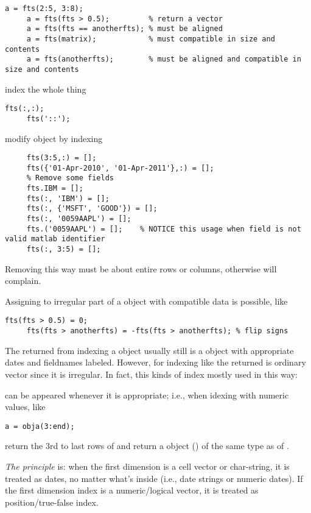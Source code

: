 \begin{itemize*}
\begin{lstlisting}[numbers=none]
     a = fts(2:5, 3:8);
     a = fts(fts > 0.5);         % return a vector
     a = fts(fts == anotherfts); % must be aligned 
     a = fts(matrix);            % must compatible in size and contents
     a = fts(anotherfts);        % must be aligned and compatible in size and contents
 \end{lstlisting}
\item index the whole thing
  \begin{lstlisting}[numbers=none]
     fts(:,:);
     fts('::');
  \end{lstlisting}
\item modify \myfints{} object by indexing
  \begin{lstlisting}[numbers=none]
     % Remove some dates
     fts(3:5,:) = [];            
     fts({'01-Apr-2010', '01-Apr-2011'},:) = []; 
     % Remove some fields
     fts.IBM = [];
     fts(:, 'IBM') = [];
     fts(:, {'MSFT', 'GOOD'}) = [];
	 fts(:, '0059AAPL') = [];
	 fts.('0059AAPL') = [];    % NOTICE this usage when field is not valid matlab identifier
     fts(:, 3:5) = [];
  \end{lstlisting} 
  Removing this way must be about entire rows or columns, otherwise \matlab{} will complain.
  
  Assigning to irregular part of a \myfints{} object with compatible data is possible, like
  \begin{lstlisting}[numbers=none]
     fts(fts > 0.5) = 0;
     fts(fts > anotherfts) = -fts(fts > anotherfts); % flip signs
  \end{lstlisting}
\end{itemize*}
   
  The returned from indexing a \myfints{} object usually still is a \myfints{} object
  with appropriate dates and fieldnames labeled. 
  However, for indexing like  the returned is ordinary \matlab{} vector
  since it is irregular. 
  In fact, this kinds of index mostly used in this way: 

   can be appeared whenever it is appropriate; 
  i.e., when idexing with numeric values, like
  \begin{lstlisting}[numbers=none]
      a = obja(3:end);
  \end{lstlisting}
  return the 3rd to last rows of  and return a object () of the 
  same type as of .

  \emph{The principle} is: when the first dimension is a cell vector or char-string, it is treated as dates, 
  no matter what's inside (i.e., date strings or numeric dates). 
  If the first dimension index is a numeric/logical vector, it is treated as position/true-false index.

